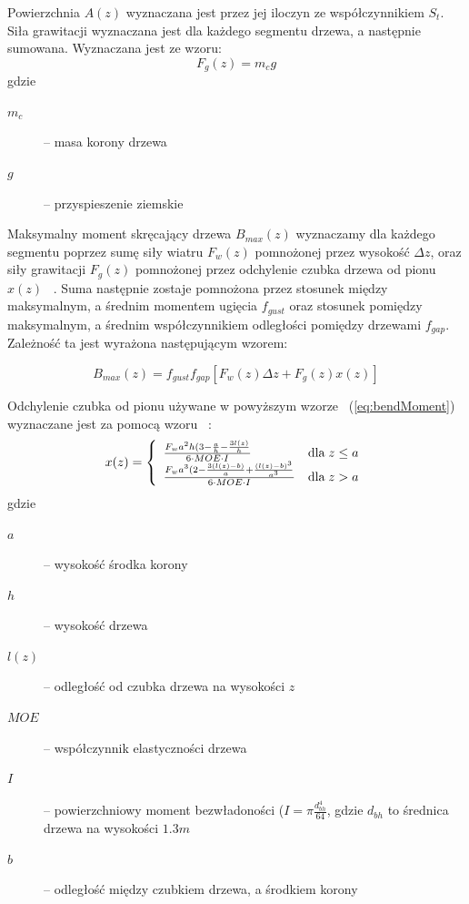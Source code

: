 Powierzchnia $A(z)$ wyznaczana jest przez jej iloczyn ze współczynnikiem $S_t$.
\\

Siła grawitacji wyznaczana jest dla każdego segmentu drzewa, a następnie sumowana. Wyznaczana jest ze wzoru:
\begin{equation}
\label{eq:gravityForce}
F_g(z) = m_c g
\end{equation}
gdzie
\begin{description}
  \item[$m_c$] -- masa korony drzewa
  \item[$g$] -- przyspieszenie ziemskie
\end{description}

Maksymalny moment skręcający drzewa $B_{max}(z)$ wyznaczamy dla każdego segmentu poprzez sumę siły wiatru $F_w(z)$ pomnożonej przez wysokość $\Delta z$, oraz siły grawitacji $F_g(z)$ pomnożonej przez odchylenie czubka drzewa od pionu $x(z)$ ~\cite{chm_ang}. Suma następnie zostaje pomnożona przez stosunek między maksymalnym, a średnim momentem ugięcia $f_{gust}$ oraz stosunek pomiędzy maksymalnym, a średnim współczynnikiem odległości pomiędzy drzewami $f_{gap}$. Zależność ta jest wyrażona następującym wzorem:

\begin{equation}
\label{eq:bendMoment}
B_{max}(z) = f_{gust} f_{gap} [ F_w(z) \Delta z + F_g(z) x(z)]
\end{equation}

Odchylenie czubka od pionu używane w powyższym wzorze ~(\ref{eq:bendMoment}) wyznaczane jest za pomocą wzoru ~\cite{chm_ang}:
\begin{equation}
\label{eq:crovnDeviation}
 x(z) =
\left\{
  \begin{array}{l r}
  	\frac{F_w a^2h(3- \frac{a}{h} - \frac{3l(z)}{h} }{6 \cdot MOE \cdot I} 	& \text{dla} \; z \leq a\\
    	\frac{F_w a^3 (2-\frac{3(l(z)-b)}{a} + \frac{(l(z) - b)^3}{a^3}}{6 \cdot MOE \cdot I} & \text{dla} \; z > a\\
  \end{array} \right.
\end{equation}
gdzie
\begin{description}
\item[$a$] -- wysokość środka korony
\item[$h$] -- wysokość drzewa
\item[$l(z)$] -- odległość od czubka drzewa na wysokości $z$
\item[$MOE$] -- współczynnik elastyczności drzewa
\item[$I$] -- powierzchniowy moment bezwładoności ($I = \pi \frac{d_{bh}^4}{64}$, gdzie $d_{bh}$ to średnica drzewa na wysokości $1.3m$
\item[$b$] -- odległość między czubkiem drzewa, a środkiem korony
\end{description}





